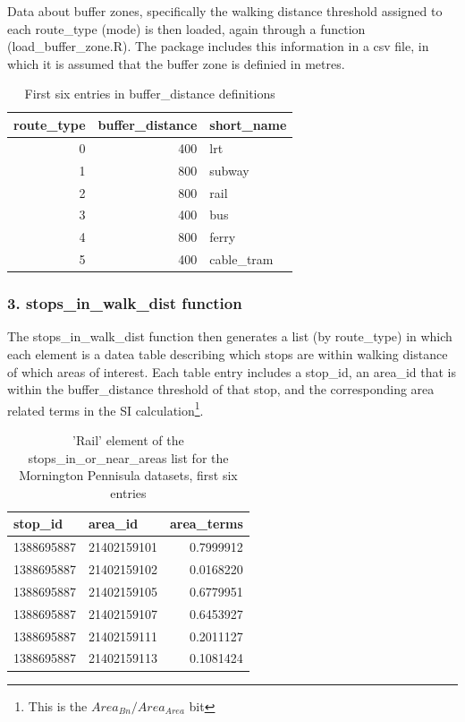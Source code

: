 \documentclass[preprint, 3p,
authoryear]{elsarticle} %
\begin{document}
Data about buffer zones, specifically the walking distance threshold
assigned to each route\_type (mode) is then loaded, again through a
function (load\_buffer\_zone.R). The package includes this information
in a csv file, in which it is assumed that the buffer zone is definied
in metres.

\begin{table}

\caption{\label{tab:load_buffer_distance_data}First six entries in buffer_distance definitions}
\centering
\begin{tabular}[t]{r|r|l}
\hline
route\_type & buffer\_distance & short\_name\\
\hline
0 & 400 & lrt\\
\hline
1 & 800 & subway\\
\hline
2 & 800 & rail\\
\hline
3 & 400 & bus\\
\hline
4 & 800 & ferry\\
\hline
5 & 400 & cable\_tram\\
\hline
\end{tabular}
\end{table}

\hypertarget{stops_in_walk_dist-function}{%
\subsubsection{3. stops\_in\_walk\_dist
function}\label{stops_in_walk_dist-function}}

The stops\_in\_walk\_dist function then generates a list (by
route\_type) in which each element is a datea table describing which
stops are within walking distance of which areas of interest. Each table
entry includes a stop\_id, an area\_id that is within the
buffer\_distance threshold of that stop, and the corresponding area
related terms in the SI calculation\footnote{This is the
  \(Area_{Bn} / Area_{Area}\) bit}.

\begin{table}

\caption{\label{tab:calculate_stop_in_or_near_areas}'Rail' element of the stops_in_or_near_areas list for the Mornington Pennisula datasets, first six entries}
\centering
\begin{tabular}[t]{l|l|r}
\hline
stop\_id & area\_id & area\_terms\\
\hline
1388695887 & 21402159101 & 0.7999912\\
\hline
1388695887 & 21402159102 & 0.0168220\\
\hline
1388695887 & 21402159105 & 0.6779951\\
\hline
1388695887 & 21402159107 & 0.6453927\\
\hline
1388695887 & 21402159111 & 0.2011127\\
\hline
1388695887 & 21402159113 & 0.1081424\\
\hline
\end{tabular}
\end{table}
\end{document}
